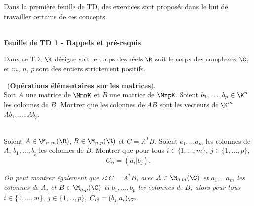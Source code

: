 Dans la première feuille de TD, des exercices sont proposés dans le but de travailler certains de ces concepts.
\\ \\
\begin{center}
{\large {\bf Feuille de TD 1 - Rappels et pré-requis}}
\end{center}

Dans ce TD, $\K$ désigne soit le corps des réels $\R$ soit le corps des complexes $\C$, et $m,\,n,\,p$ sont des entiers strictement positifs.



\begin{exo}\ ({\bf Opérations élémentaires sur les matrices}). \\
  Soit $A$ une matrice de $\MmnK$ et $B$ une matrice de $\MnpK$. Soient $b_1,\dots,b_p\in\K^n$ les colonnes de $B$. Montrer que les colonnes de $AB$ sont les vecteurs de $\K^m$ $Ab_1,\dots,Ab_p$.
\end{exo}


\begin{exo}\ \\
  Soient $A\in\M_{n,m}(\R)$, $B\in\M_{n,p}(\R)$ et $C=A^TB$. Soient $a_1,\dots a_m$ les colonnes de $A$, $b_1,\dots, b_p$ les colonnes de $B$. Montrer que pour tous $i\in\{1,\dots,m\},\ j\in\{1,\dots,p\}$,
$$
C_{ij}=
(a_i|b_j).
$$

{\it On peut montrer également que si $C=A^*B$, avec $A\in\M_{n,m}(\C)$ et $a_1,\dots a_m$ les colonnes de $A$, et $B\in\M_{n,p}(\C)$ et $b_1,\dots, b_p$ les colonnes de $B$, alors pour tous $i\in\{1,\dots,m\},\ j\in\{1,\dots,p\}$,
$
C_{ij}=
(b_j|a_i)_{\C^n}.
$}
	\solution{
	}
\end{exo}



